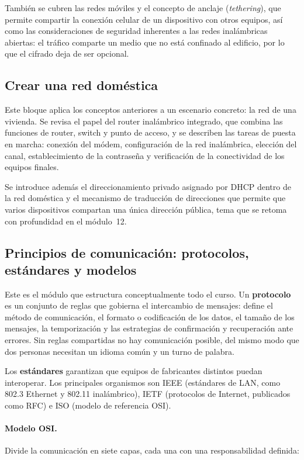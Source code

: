 \documentclass[11pt,a4paper]{article}
\begin{document}
También se cubren las redes móviles y el concepto de anclaje
(\textit{tethering}), que permite compartir la conexión celular de un
dispositivo con otros equipos, así como las consideraciones de seguridad
inherentes a las redes inalámbricas abiertas: el tráfico comparte un medio
que no está confinado al edificio, por lo que el cifrado deja de ser opcional.

\subsection{Crear una red doméstica}

Este bloque aplica los conceptos anteriores a un escenario concreto: la red de
una vivienda. Se revisa el papel del router inalámbrico integrado, que combina
las funciones de router, switch y punto de acceso, y se describen las tareas de
puesta en marcha: conexión del módem, configuración de la red inalámbrica,
elección del canal, establecimiento de la contraseña y verificación de la
conectividad de los equipos finales.

Se introduce además el direccionamiento privado asignado por DHCP dentro de la
red doméstica y el mecanismo de traducción de direcciones que permite que
varios dispositivos compartan una única dirección pública, tema que se retoma
con profundidad en el módulo~12.

\subsection{Principios de comunicación: protocolos, estándares y modelos}

Este es el módulo que estructura conceptualmente todo el curso. Un
\textbf{protocolo} es un conjunto de reglas que gobierna el intercambio de
mensajes: define el método de comunicación, el formato o codificación de los
datos, el tamaño de los mensajes, la temporización y las estrategias de
confirmación y recuperación ante errores. Sin reglas compartidas no hay
comunicación posible, del mismo modo que dos personas necesitan un idioma
común y un turno de palabra.

Los \textbf{estándares} garantizan que equipos de fabricantes distintos puedan
interoperar. Los principales organismos son IEEE (estándares de LAN, como
802.3 Ethernet y 802.11 inalámbrico), IETF (protocolos de Internet, publicados
como RFC) e ISO (modelo de referencia OSI).

\paragraph{Modelo OSI.} Divide la comunicación en siete capas, cada una con una
responsabilidad definida:
\end{document}
